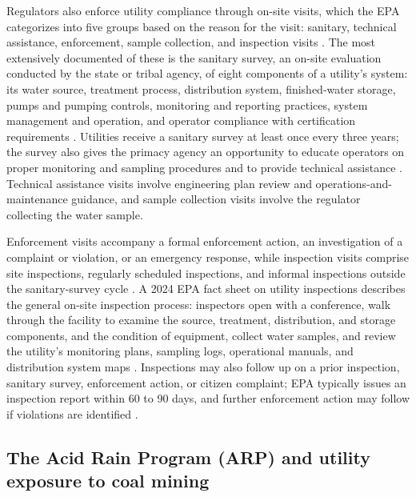 \documentclass[12pt]{article}
\begin{document}
Regulators also enforce utility compliance through on-site visits, which the EPA categorizes into five groups based on the reason for the visit: sanitary, technical assistance, enforcement, sample collection, and inspection visits \parencite{epaSDWAEchoDownload}. The most extensively documented of these is the sanitary survey, an on-site evaluation conducted by the state or tribal agency, of eight components of a utility's system: its water source, treatment process, distribution system, finished-water storage, pumps and pumping controls, monitoring and reporting practices, system management and operation, and operator compliance with certification requirements \parencite{epaSanitarySurveys}. Utilities receive a sanitary survey at least once every three years; the survey also gives the primacy agency an opportunity to educate operators on proper monitoring and sampling procedures and to provide technical assistance \parencite{epaSanitarySurveys}. Technical assistance visits involve engineering plan review and operations-and-maintenance guidance, and sample collection visits involve the regulator collecting the water sample.

Enforcement visits accompany a formal enforcement action, an investigation of a complaint or violation, or an emergency response, while inspection visits comprise site inspections, regularly scheduled inspections, and informal inspections outside the sanitary-survey cycle \parencite{epaSDWAEchoDownload}. A 2024 EPA fact sheet on utility inspections describes the general on-site inspection process: inspectors open with a conference, walk through the facility to examine the source, treatment, distribution, and storage components, and the condition of equipment, collect water samples, and review the utility's monitoring plans, sampling logs, operational manuals, and distribution system maps \parencite{epaInspectionFactsheet2024}. Inspections may also follow up on a prior inspection, sanitary survey, enforcement action, or citizen complaint; EPA typically issues an inspection report within 60 to 90 days, and further enforcement action may follow if violations are identified \parencite{epaInspectionFactsheet2024}.

\subsection{The Acid Rain Program (ARP) and utility exposure to coal mining}
\end{document}
